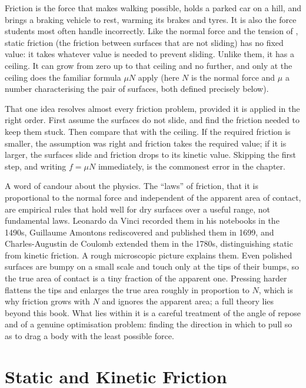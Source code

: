 \label{ch:friction}

Friction is the force that makes walking possible, holds a parked car on a hill, and brings a braking
vehicle to rest, warming its brakes and tyres. It is also the force students most often handle incorrectly. Like the normal force and the tension of
, static friction (the friction between surfaces that are not sliding) has no fixed value: it takes whatever value is needed to prevent
sliding. Unlike them, it has a ceiling. It can grow from zero up to that ceiling and no further, and only
at the ceiling does the familiar formula $\mu N$ apply (here $N$ is the normal force and $\mu$ a
number characterising the pair of surfaces, both defined precisely below).

That one idea resolves almost every friction problem, provided it is applied in the right order.
First assume the surfaces do not slide, and find the friction needed to keep them stuck. Then compare that
with the ceiling. If the required friction is smaller, the assumption was right and friction takes the
required value; if it is larger, the surfaces slide and friction drops to its kinetic value. Skipping the
first step, and writing $f=\mu N$ immediately, is the commonest error in the chapter.

A word of candour about the physics. The ``laws'' of friction, that it is proportional to the normal
force and independent of the apparent area of contact, are empirical rules that hold well for dry
surfaces over a useful range, not fundamental laws. Leonardo da Vinci recorded them in his notebooks
in the 1490s, Guillaume Amontons rediscovered and published them in 1699, and Charles-Augustin de Coulomb
extended them in the 1780s, distinguishing static from kinetic friction. A rough microscopic picture
explains them. Even polished surfaces are bumpy on a small scale and touch only at the tips of their
bumps, so the true area of contact is a tiny fraction of the apparent one. Pressing harder flattens the
tips and enlarges the true area roughly in proportion to $N$, which is why friction grows with $N$ and
ignores the apparent area; a full theory lies beyond this book. What lies
within it is a careful treatment of the angle of repose and of a genuine optimisation problem: finding
the direction in which to pull so as to drag a body with the least possible force.

\section{Static and Kinetic Friction}

